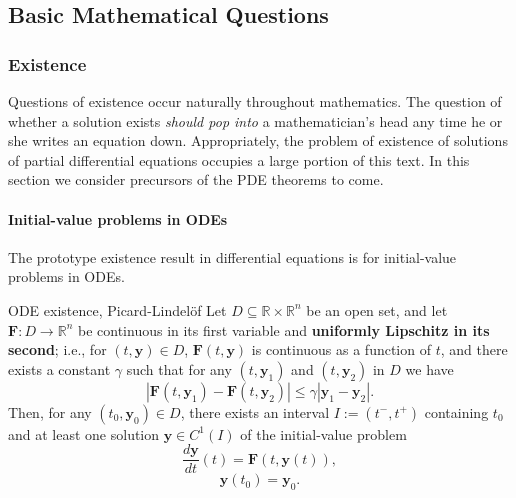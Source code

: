 \subsection{Basic Mathematical Questions}\label{sec:basic-mathematical-questions}

\subsubsection{Existence}\label{subsec:existence}

Questions of existence occur naturally throughout mathematics. The question of whether a solution exists \emph{should pop into} a mathematician's head any time he or she writes an equation down. Appropriately, the problem of existence of solutions of partial differential equations occupies a large portion of this text. In this section we consider precursors of the PDE theorems to come.

\paragraph*{Initial-value problems in ODEs}

The prototype existence result in differential equations is for initial-value problems in ODEs.

\begin{Theorem}{ODE existence, Picard-Lindelöf}
\label{thm:ode-existence}
Let $D\subseteq\mathbb{R}\times\mathbb{R}^n$ be an open set, and let $\mathbf{F}:D\to\mathbb{R}^n$ be continuous in its first variable and \textbf{uniformly Lipschitz in its second}; i.e., for $(t,\mathbf{y})\in D$, $\mathbf{F}(t,\mathbf{y})$ is continuous as a function of $t$, and there exists a constant $\gamma$ such that for any $(t,\mathbf{y}_1)$ and $(t,\mathbf{y}_2)$ in $D$ we have
\begin{equation}\label{eq:uniform-lipschitz-bound}
|\mathbf{F}(t,\mathbf{y}_1)-\mathbf{F}(t,\mathbf{y}_2)|\leq\gamma|\mathbf{y}_1-\mathbf{y}_2|.
\end{equation}
Then, for any $(t_0,\mathbf{y}_0)\in D$, there exists an interval $I:=(t^-,t^+)$ containing $t_0$ and at least one solution $\mathbf{y}\in C^1(I)$ of the initial-value problem
\begin{equation}\label{eq:ode-initial-value-dynamics}
\frac{d\mathbf{y}}{dt}(t)=\mathbf{F}(t,\mathbf{y}(t)),
\end{equation}
\begin{equation}\label{eq:ode-initial-value-data}
\mathbf{y}(t_0)=\mathbf{y}_0.
\end{equation}
\end{Theorem}

